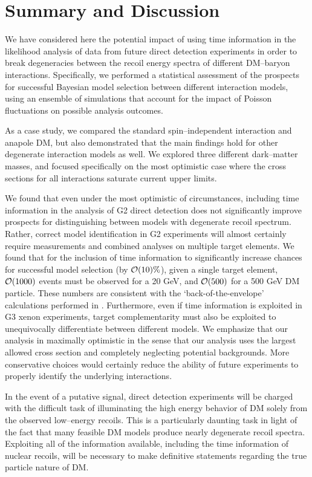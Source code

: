 \documentclass[11pt]{article}
\begin{document}
\section{Summary and Discussion}\label{sec:conclusion}
We have considered here the potential impact of using time information in the likelihood analysis of data from future direct detection experiments in order to break degeneracies between the recoil energy spectra of different DM--baryon interactions. Specifically, we performed a statistical assessment of the prospects for successful Bayesian model selection between different interaction models, using an ensemble of simulations that account for the impact of Poisson fluctuations on possible analysis outcomes. 

As a case study, we compared the standard spin--independent interaction and anapole DM, but also demonstrated that the main findings hold for other degenerate interaction models as well. We explored three different dark--matter masses, and focused specifically on the most optimistic case where the cross sections for all interactions saturate current upper limits. 

We found that even under the most optimistic of circumstances, including time information in the analysis of G2 direct detection does not significantly improve prospects for distinguishing between models with degenerate recoil spectrum. Rather, correct model identification in G2 experiments will almost certainly require measurements and combined analyses on multiple target elements. We found that for the inclusion of time information to significantly increase chances for successful model selection (by ${\cal O}(10)\%$), given a single target element, ${\cal O}(1000)$ events must be observed for a 20 GeV, and ${\cal O}(500)$ for a 500 GeV DM particle. These numbers are consistent with the `back-of-the-envelope' calculations performed in \cite{DelNobile:2015nua}. Furthermore, even if time information is exploited in G3 xenon experiments, target complementarity must also be exploited to unequivocally differentiate between different models. We emphasize that our analysis in maximally optimistic in the sense that our analysis uses the largest allowed cross section and completely neglecting potential backgrounds. More conservative choices would certainly reduce the ability of future experiments to properly identify the underlying interactions.


In the event of a putative signal, direct detection experiments will be charged with the difficult task of illuminating the high energy behavior of DM solely from the observed low--energy recoils. This is a particularly daunting task in light of the fact that many feasible DM models produce nearly degenerate recoil spectra. Exploiting all of the information available, including the time information of nuclear recoils, will be necessary to make definitive statements regarding the true particle nature of DM.
\end{document}
